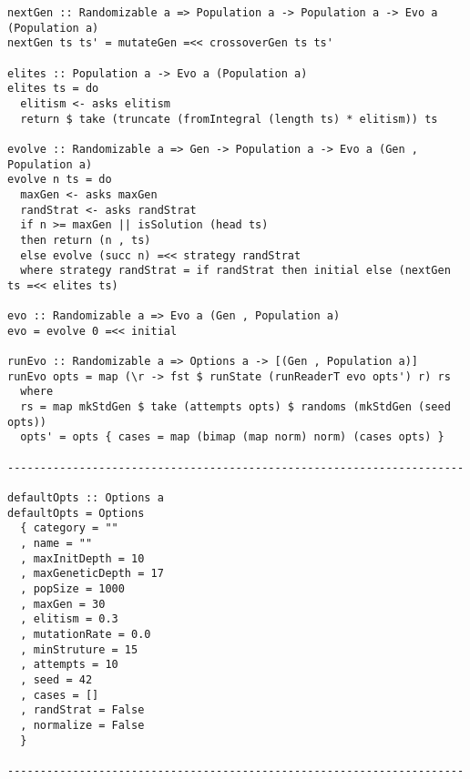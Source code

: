 \documentclass{article}
\begin{document}
\begin{lstlisting}
nextGen :: Randomizable a => Population a -> Population a -> Evo a (Population a)
nextGen ts ts' = mutateGen =<< crossoverGen ts ts'

elites :: Population a -> Evo a (Population a)
elites ts = do
  elitism <- asks elitism
  return $ take (truncate (fromIntegral (length ts) * elitism)) ts

evolve :: Randomizable a => Gen -> Population a -> Evo a (Gen , Population a)
evolve n ts = do
  maxGen <- asks maxGen
  randStrat <- asks randStrat
  if n >= maxGen || isSolution (head ts)
  then return (n , ts)
  else evolve (succ n) =<< strategy randStrat
  where strategy randStrat = if randStrat then initial else (nextGen ts =<< elites ts)

evo :: Randomizable a => Evo a (Gen , Population a)
evo = evolve 0 =<< initial

runEvo :: Randomizable a => Options a -> [(Gen , Population a)]
runEvo opts = map (\r -> fst $ runState (runReaderT evo opts') r) rs
  where
  rs = map mkStdGen $ take (attempts opts) $ randoms (mkStdGen (seed opts))
  opts' = opts { cases = map (bimap (map norm) norm) (cases opts) }

----------------------------------------------------------------------

defaultOpts :: Options a
defaultOpts = Options
  { category = ""
  , name = ""
  , maxInitDepth = 10
  , maxGeneticDepth = 17
  , popSize = 1000
  , maxGen = 30
  , elitism = 0.3
  , mutationRate = 0.0
  , minStruture = 15
  , attempts = 10
  , seed = 42
  , cases = []
  , randStrat = False
  , normalize = False
  }

----------------------------------------------------------------------
\end{lstlisting}
\end{document}
